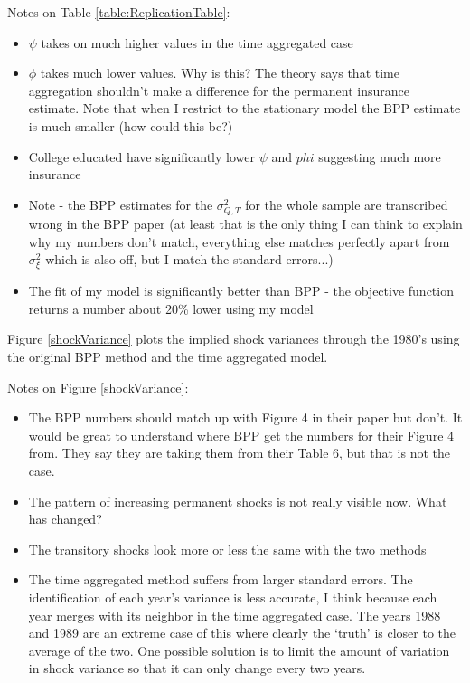 \documentclass[titlepage]{\econtex}\newcommand{\texname}{BPP_PSID_TimeAgg}
\begin{document}


Notes on Table \ref{table:ReplicationTable}:
\begin{itemize}
	\item $\psi$ takes on much higher values in the time aggregated case
	\item $\phi$ takes much lower values. Why is this? The theory says that time aggregation shouldn't make a difference for the permanent insurance estimate. Note that when I restrict to the stationary model the BPP estimate is much smaller (how could this be?)
	\item College educated have significantly lower $\psi$ and $phi$ suggesting much more insurance
	\item Note - the BPP estimates for the $\sigma^2_{Q,T}$ for the whole sample are transcribed wrong in the BPP paper (at least that is the only thing I can think to explain why my numbers don't match, everything else matches perfectly apart from $\sigma^2_{\xi}$ which is also off, but I match the standard errors...)
	\item The fit of my model is significantly better than BPP - the objective function returns a number about 20\% lower using my model
\end{itemize}

Figure \ref{shockVariance} plots the implied shock variances through the 1980's using the original BPP method and the time aggregated model.

Notes on Figure \ref{shockVariance}:
\begin{itemize}
	\item The BPP numbers should match up with Figure 4 in their paper but don't. It would be great to understand where BPP get the numbers for their Figure 4 from. They say they are taking them from their Table 6, but that is not the case.
	\item The pattern of increasing permanent shocks is not really visible now. What has changed?
	\item The transitory shocks look more or less the same with the two methods
	\item The time aggregated method suffers from larger standard errors. The identification of each year's variance is less accurate, I think because each year merges with its neighbor in the time aggregated case. The years 1988 and 1989 are an extreme case of this where clearly the `truth' is closer to the average of the two. One possible solution is to limit the amount of variation in shock variance so that it can only change every two years.
\end{itemize}
\end{document}

